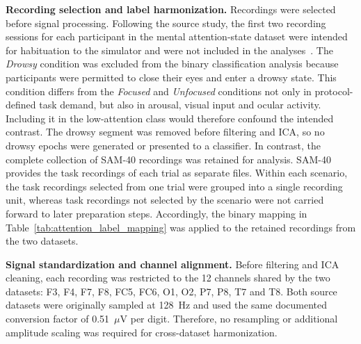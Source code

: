 \documentclass[10pt,letterpaper]{article}
\newcommand{\rev}[1]{#1}
\begin{document}
\rev{\textbf{Recording selection and label harmonization.} Recordings were selected
before signal processing. Following the source study, the first two recording
sessions for each participant in the mental attention-state dataset were
intended for habituation to the simulator and were not included in the
analyses~\cite{aci2019attention}. The \textit{Drowsy} condition was excluded
from the binary classification analysis because participants were
permitted to close their eyes and enter a drowsy state. This condition differs
from the \textit{Focused} and \textit{Unfocused} conditions not only in
protocol-defined task demand, but also in arousal, visual input and ocular
activity. Including it in the low-attention class would therefore confound the
intended contrast. The drowsy segment was removed before filtering and ICA, so
no drowsy epochs were generated or presented to a classifier. In contrast, the complete collection of SAM-40 recordings was
retained for analysis. SAM-40 provides the task recordings of each trial as
separate files. Within each scenario, the task recordings selected from one
trial were grouped into a single recording unit, whereas task recordings not
selected by the scenario were not carried forward to later preparation steps.
Accordingly, the binary mapping in Table~\ref{tab:attention_label_mapping} was applied to the
retained recordings from the two datasets.}

\rev{\textbf{Signal standardization and channel alignment.} Before filtering
and ICA cleaning, each recording was restricted to the 12 channels shared by
the two datasets: F3, F4, F7, F8, FC5, FC6, O1, O2, P7, P8, T7 and T8. Both
source datasets were originally sampled at 128~Hz and used the same documented
conversion factor of 0.51~$\mu$V per digit. Therefore, no resampling or
additional amplitude scaling was required for cross-dataset harmonization.}
\end{document}
